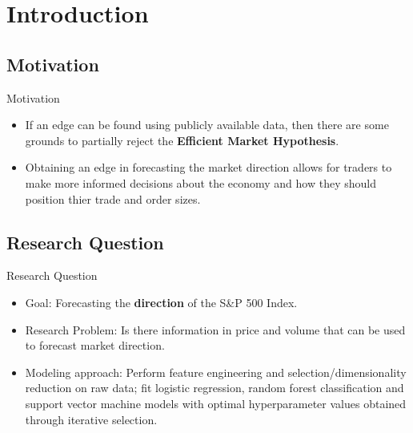 \documentclass[aspectratio=43]{beamer} %
\begin{document}

\section{Introduction}

\subsection{Motivation}
\begin{frame}{Motivation}
\begin{itemize}
  \item If an edge can be found using publicly available data, then there are some grounds to partially reject the \textbf{Efficient Market Hypothesis}.
  \item Obtaining an edge in forecasting the market direction allows for traders to make more informed decisions about the economy and how they should position thier trade and order sizes.
\end{itemize}
\end{frame}

\subsection{Research Question}
\begin{frame}{Research Question}
\begin{itemize}
  \item Goal: Forecasting the \textbf{direction} of the S\&P 500 Index.
  \item Research Problem: Is there information in price and volume that can be used to forecast market direction.
  \item Modeling approach: Perform feature engineering and selection/dimensionality reduction on raw data; fit logistic regression, random forest classification and support vector machine models with optimal hyperparameter values obtained through iterative selection. %
\end{itemize}
\end{frame}
\end{document}
